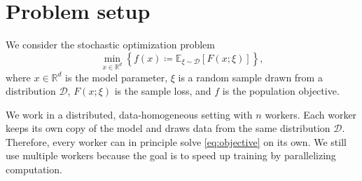 \documentclass{article}
\newcommand{\nbr}[1]{\left\{#1\right\}} %
\newcommand{\cD}{\mathcal{D}}
\newcommand{\R}{\mathbb{R}}  %
\newcommand{\eqdef}{\coloneqq}
\newcommand{\ExpSub}[2]{{\mathbb{E}}_{#1}\left[#2\right]}
\theoremstyle{plain}
\theoremstyle{definition}
\begin{document}
\section{Problem setup}\label{sec:problem_setup}
% 
We consider the stochastic optimization problem
\begin{equation}\label{eq:objective}%
    \min_{x \in \R^d} \nbr{ f(x) \eqdef \ExpSub{\xi \sim \cD}{F(x;\xi)} } ,
\end{equation}
where $x \in \R^d$ is the model parameter,
$\xi$ is a random sample drawn from a distribution $\cD$,
$F(x;\xi)$ is the sample loss,
and $f$ is the population objective.

We work in a distributed, data-homogeneous setting with \(n\) workers.
Each worker keeps its own copy of the model and draws data from the same distribution \(\cD\).
Therefore, every worker can in principle solve \eqref{eq:objective} on its own.
We still use multiple workers because the goal is to speed up training by parallelizing computation.
\end{document}
